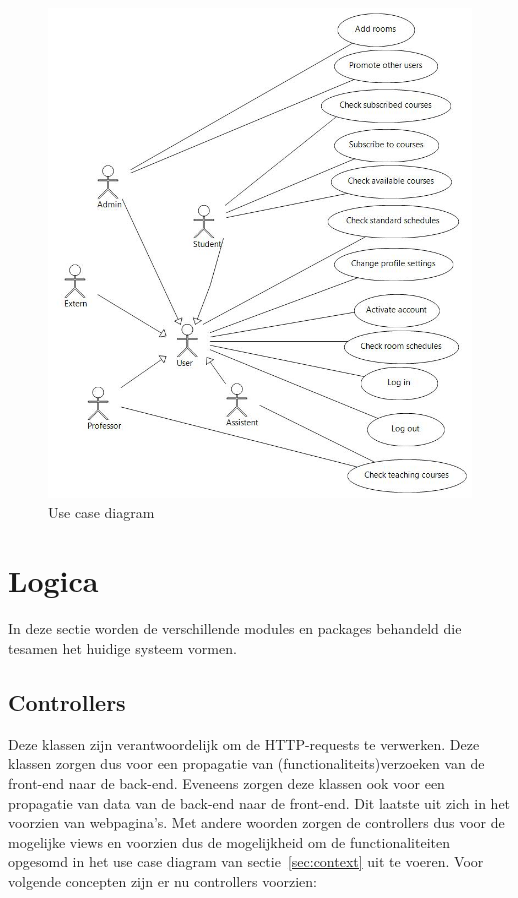 \begin{figure}[H]
	\centering
	\includegraphics[scale=0.5]{img/use_cases}
	\caption{Use case diagram}
	\label{fig:usecase}
\end{figure}

\section{Logica}
\label{sec:logica}

In deze sectie worden de verschillende modules en packages behandeld die tesamen het huidige systeem vormen.

\subsection{Controllers}
\label{subsec:controllers}

Deze klassen zijn verantwoordelijk om de HTTP-requests te verwerken. 
Deze klassen zorgen dus voor een propagatie van (functionaliteits)verzoeken van de front-end naar de back-end. 
Eveneens zorgen deze klassen ook voor een propagatie van data van de back-end naar de front-end. 
Dit laatste uit zich in het voorzien van webpagina's.
Met andere woorden zorgen de controllers dus voor de mogelijke views en voorzien dus de mogelijkheid om de functionaliteiten opgesomd in het use case diagram van sectie~\ref{sec:context} uit te voeren. 
Voor volgende concepten zijn er nu controllers voorzien:

